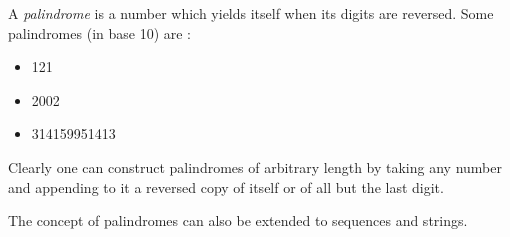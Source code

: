 \documentclass[12pt]{article}
\begin{document}
A \emph{palindrome} is a number which yields itself when its digits are reversed.  Some palindromes (in base 10) are :

\begin{itemize}
\item 121
\item 2002
\item 314159951413
\end{itemize}

Clearly one can construct palindromes of arbitrary length by taking any number and appending to it a reversed copy of itself or of all but the last digit.

The concept of palindromes can also be extended to sequences and strings.
\end{document}
